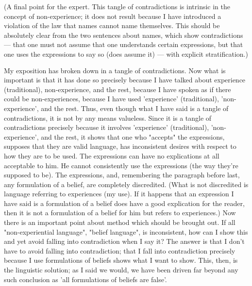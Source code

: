 \documentclass[10pt,twoside,draft]{memoir}
\begin{document}
{(A final point for the expert. This 
tangle of contradictions is intrinsic in the concept of non-experience; it does 
not result because I have introduced a violation of the law that names cannot 
name themselves. This should be absolutely clear from the two sentences 
about names, which show contradictions --- that one must not assume that 
one understands certain expressions, but that one uses the expressions to say 
so (does assume it) --- with explicit stratification.) 

My exposition has broken down in a tangle of contradictions. Now 
what is important is that it has done so precisely because I have talked about 
experience (traditional), non-experience, and the rest, because I have spoken 
as if there could be non-experiences, because I have used 'experience' 
(traditional), 'non-experience', and the rest. Thus, even though what I have 
said is a tangle of contradictions, it is not by any means valueless. Since it is 
a tangle of contradictions precisely because it involves 'experience' 
(traditional), 'non-experience', and the rest, it shows that one who "accepts" 
the expressions, supposes that they are valid language, has inconsistent 
desires with respect to how they are to be used. The expressions can have no 
explications at all acceptable to him. He cannot consistently use the 
expressions (the way they're supposed to be). The expressions, and, 
remembering the paragraph before last, any formulation of a belief, are 
completely discredited. (What is not discredited is language referring to 
experiences (my use). If it happens that an expression I have said is a 
formulation of a belief does have a good explication for the reader, then it is 
not a formulation of a belief for him but refers to experiences.) Now there is 
an important point about method which should be brought out. If all 
"non-experiential language", "belief language", is inconsistent, how can I 
show this and yet avoid falling into contradiction when I say it? The answer 
is that I don't have to avoid falling into contradiction; that I fall into 
contradiction precisely because I use formulations of beliefs shows what I 
want to show. This, then, is the linguistic solution; as I said we would, we 
have been driven far beyond any such conclusion as 'all formulations of 
beliefs are false'. 

}
\end{document}
